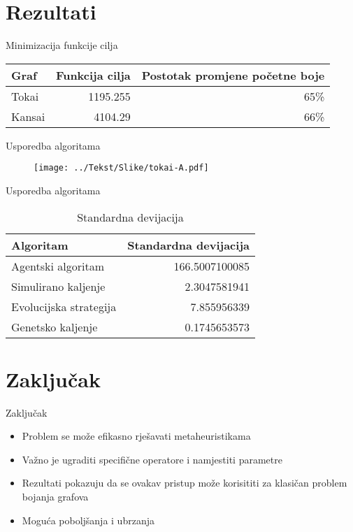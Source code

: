 \documentclass[utf8]{beamer}
\begin{document}
\section{Rezultati}
\begin{frame}{Minimizacija funkcije cilja}
\begin{table}[htb]
	\centering
	\begin{tabular}{|l|r|r|} \hline
	Graf & Funkcija cilja & Postotak promjene početne boje \\ \hline \hline
	Tokai & 1195.255 & 65\% \\ \hline
	Kansai & 4104.29 & 66\% \\ \hline
	\end{tabular}
\end{table}

\end{frame}


\begin{frame}{Usporedba algoritama}
\begin{figure}[h]
  \centering
  \texttt{[image: ../Tekst/Slike/tokai-A.pdf]}
\end{figure}
\end{frame}

\begin{frame}{Usporedba algoritama}
\begin{table}[htb]
	\centering
	\caption{Standardna devijacija}
	\begin{tabular}{|l|r|} \hline
	Algoritam & Standardna devijacija \\ \hline \hline
	Agentski algoritam  & 166.5007100085  \\ \hline
	Simulirano kaljenje & 2.3047581941 \\ \hline
	Evolucijska strategija & 7.855956339 \\ \hline
	Genetsko kaljenje & 0.1745653573 \\ \hline
	\end{tabular}
\end{table}
\end{frame}


\section{Zaključak}
\begin{frame}{Zaključak}
	\begin{itemize}
		\item Problem se može efikasno rješavati metaheuristikama
		\pause
		\item Važno je ugraditi specifične operatore i namjestiti parametre
		\pause
		\item Rezultati pokazuju da se ovakav pristup može korisititi za klasičan problem bojanja grafova
		\pause
		\item Moguća poboljšanja i ubrzanja
	\end{itemize}
\end{frame}
\end{document}
